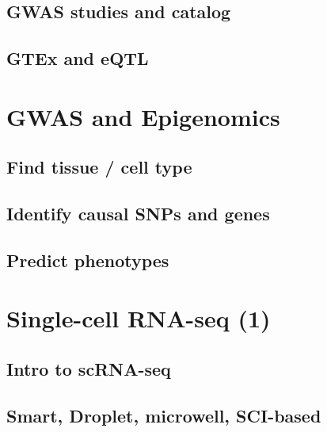 \documentclass[
]{book}
\begin{document}
\hypertarget{gwas-studies-and-catalog}{%
\section{GWAS studies and catalog}\label{gwas-studies-and-catalog}}

\hypertarget{gtex-and-eqtl}{%
\section{GTEx and eQTL}\label{gtex-and-eqtl}}

\hypertarget{gwas2}{%
\chapter{GWAS and Epigenomics}\label{gwas2}}

\hypertarget{find-tissue-cell-type}{%
\section{Find tissue / cell type}\label{find-tissue-cell-type}}

\hypertarget{identify-causal-snps-and-genes}{%
\section{Identify causal SNPs and genes}\label{identify-causal-snps-and-genes}}

\hypertarget{predict-phenotypes}{%
\section{Predict phenotypes}\label{predict-phenotypes}}

\hypertarget{scrna1}{%
\chapter{Single-cell RNA-seq (1)}\label{scrna1}}

\hypertarget{intro-to-scrna-seq}{%
\section{Intro to scRNA-seq}\label{intro-to-scrna-seq}}

\hypertarget{smart-droplet-microwell-sci-based}{%
\section{Smart, Droplet, microwell, SCI-based}\label{smart-droplet-microwell-sci-based}}
\end{document}
